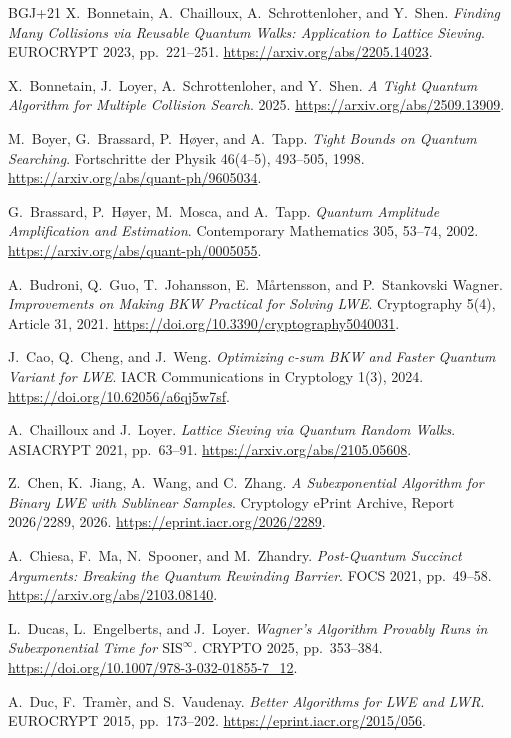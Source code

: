 \documentclass[runningheads,envcountsame,envcountsect,orivec]{llncs}
\begin{document}
\begin{thebibliography}{BGJ+21}
X.~Bonnetain, A.~Chailloux, A.~Schrottenloher, and Y.~Shen.
\emph{Finding Many Collisions via Reusable Quantum Walks:
Application to Lattice Sieving}.
EUROCRYPT 2023, pp.~221--251.
\url{https://arxiv.org/abs/2205.14023}.

X.~Bonnetain, J.~Loyer, A.~Schrottenloher, and Y.~Shen.
\emph{A Tight Quantum Algorithm for Multiple Collision Search}.
2025. \url{https://arxiv.org/abs/2509.13909}.

M.~Boyer, G.~Brassard, P.~H\o yer, and A.~Tapp.
\emph{Tight Bounds on Quantum Searching}.
Fortschritte der Physik 46(4--5), 493--505, 1998.
\url{https://arxiv.org/abs/quant-ph/9605034}.

G.~Brassard, P.~H\o yer, M.~Mosca, and A.~Tapp.
\emph{Quantum Amplitude Amplification and Estimation}.
Contemporary Mathematics 305, 53--74, 2002.
\url{https://arxiv.org/abs/quant-ph/0005055}.

A.~Budroni, Q.~Guo, T.~Johansson, E.~M{\aa}rtensson, and P.~Stankovski Wagner.
\emph{Improvements on Making BKW Practical for Solving LWE}.
Cryptography 5(4), Article 31, 2021.
\url{https://doi.org/10.3390/cryptography5040031}.

J.~Cao, Q.~Cheng, and J.~Weng.
\emph{Optimizing $c$-sum BKW and Faster Quantum Variant for LWE}.
IACR Communications in Cryptology 1(3), 2024.
\url{https://doi.org/10.62056/a6qj5w7sf}.

A.~Chailloux and J.~Loyer.
\emph{Lattice Sieving via Quantum Random Walks}.
ASIACRYPT 2021, pp.~63--91. \url{https://arxiv.org/abs/2105.05608}.

Z.~Chen, K.~Jiang, A.~Wang, and C.~Zhang.
\emph{A Subexponential Algorithm for Binary LWE with Sublinear Samples}.
Cryptology ePrint Archive, Report 2026/2289, 2026.
\url{https://eprint.iacr.org/2026/2289}.

A.~Chiesa, F.~Ma, N.~Spooner, and M.~Zhandry.
\emph{Post-Quantum Succinct Arguments: Breaking the Quantum Rewinding Barrier}.
FOCS 2021, pp.~49--58.
\url{https://arxiv.org/abs/2103.08140}.

L.~Ducas, L.~Engelberts, and J.~Loyer.
\emph{Wagner's Algorithm Provably Runs in Subexponential Time for $\mathrm{SIS}^{\infty}$}.
CRYPTO 2025, pp.~353--384.
\url{https://doi.org/10.1007/978-3-032-01855-7_12}.

A.~Duc, F.~Tram\`er, and S.~Vaudenay.
\emph{Better Algorithms for LWE and LWR}.
EUROCRYPT 2015, pp.~173--202.
\url{https://eprint.iacr.org/2015/056}.


\end{thebibliography}
\end{document}
